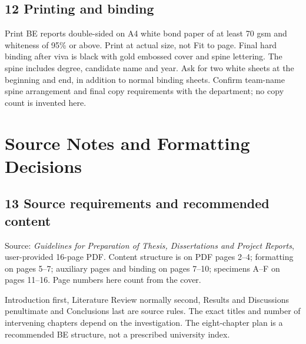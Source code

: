 \documentclass[11pt,a4paper]{article}
\newcommand{\Page}[1]{\clearpage\section*{#1}}
\begin{document}
\subsection*{12 Printing and binding}
Print BE reports double-sided on A4 white bond paper of at least 70 gsm and
whiteness of 95\% or above. Print at actual size, not Fit to page. Final hard
binding after viva is black with gold embossed cover and spine lettering. The
spine includes degree, candidate name and year. Ask for two white sheets at the
beginning and end, in addition to normal binding sheets. Confirm team-name spine
arrangement and final copy requirements with the department; no copy count is
invented here.

\Page{Source Notes and Formatting Decisions}
\subsection*{13 Source requirements and recommended content}
Source: \textit{Guidelines for Preparation of Thesis, Dissertations and Project
Reports}, user-provided 16-page PDF. Content structure is on PDF pages 2--4;
formatting on pages 5--7; auxiliary pages and binding on pages 7--10; specimens
A--F on pages 11--16. Page numbers here count from the cover.

Introduction first, Literature Review normally second, Results and Discussions
penultimate and Conclusions last are source rules. The exact titles and number
of intervening chapters depend on the investigation. The eight-chapter plan is a
recommended BE structure, not a prescribed university index.
\end{document}
